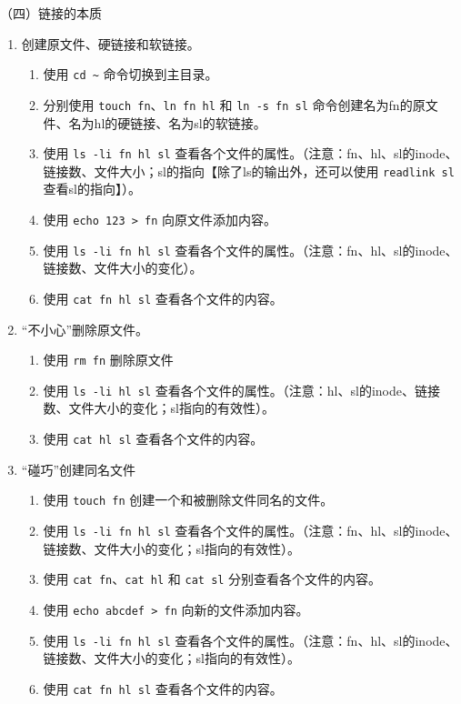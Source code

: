 \vspace{0.1in}
（四）链接的本质
\begin{enumerate}
  \item 创建原文件、硬链接和软链接。
    \begin{enumerate}
      \item 使用 \verb|cd ~| 命令切换到主目录。
      \item 分别使用 \verb|touch fn|、\verb|ln fn hl| 和 \verb|ln -s fn sl| 命令创建名为fn的原文件、名为hl的硬链接、名为sl的软链接。
      \item 使用 \verb|ls -li fn hl sl| 查看各个文件的属性。（注意：fn、hl、sl的inode、链接数、文件大小；sl的指向【除了ls的输出外，还可以使用 \verb|readlink sl| 查看sl的指向】）。
      \item 使用 \verb|echo 123 > fn| 向原文件添加内容。
      \item 使用 \verb|ls -li fn hl sl| 查看各个文件的属性。（注意：fn、hl、sl的inode、链接数、文件大小的变化）。
      \item 使用 \verb|cat fn hl sl| 查看各个文件的内容。
    \end{enumerate}
  \item “不小心”删除原文件。
    \begin{enumerate}
      \item 使用 \verb|rm fn| 删除原文件
      \item 使用 \verb|ls -li hl sl| 查看各个文件的属性。（注意：hl、sl的inode、链接数、文件大小的变化；sl指向的有效性）。
      \item 使用 \verb|cat hl sl| 查看各个文件的内容。
    \end{enumerate}
  \item “碰巧”创建同名文件
    \begin{enumerate}
      \item 使用 \verb|touch fn| 创建一个和被删除文件同名的文件。
      \item 使用 \verb|ls -li fn hl sl| 查看各个文件的属性。（注意：fn、hl、sl的inode、链接数、文件大小的变化；sl指向的有效性）。
      \item 使用 \verb|cat fn|、\verb|cat hl| 和 \verb|cat sl| 分别查看各个文件的内容。
      \item 使用 \verb|echo abcdef > fn| 向新的文件添加内容。
      \item 使用 \verb|ls -li fn hl sl| 查看各个文件的属性。（注意：fn、hl、sl的inode、链接数、文件大小的变化；sl指向的有效性）。
      \item 使用 \verb|cat fn hl sl| 查看各个文件的内容。
    \end{enumerate}
\end{enumerate}

